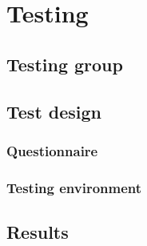 \chapter{Testing}\label{testing}
\section{Testing group}
\section{Test design}
\subsection{Questionnaire}
\subsection{Testing environment}
\section{Results}